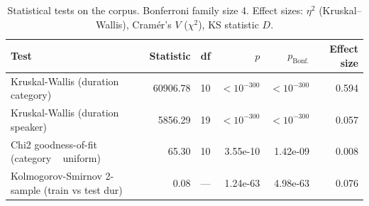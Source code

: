 \begin{table}[!t]
  \centering
  \caption{Statistical tests on the corpus. Bonferroni family size 4. Effect sizes: $\eta^2$ (Kruskal--Wallis), Cram\'er's $V$ ($\chi^2$), KS statistic $D$.}
  \label{tab:statistical_tests}
  \small
  \begin{tabular}{lrrrrr}
  \toprule
  Test & Statistic & df & $p$ & $p_{\mathrm{Bonf.}}$ & Effect size \\
  \midrule
  Kruskal-Wallis (duration ~ category) & 60906.78 & 10 & ${<}10^{-300}$ & ${<}10^{-300}$ & 0.594 \\
  Kruskal-Wallis (duration ~ speaker) & 5856.29 & 19 & ${<}10^{-300}$ & ${<}10^{-300}$ & 0.057 \\
  Chi2 goodness-of-fit (category ~ uniform) & 65.30 & 10 & 3.55e-10 & 1.42e-09 & 0.008 \\
  Kolmogorov-Smirnov 2-sample (train vs test dur) & 0.08 & --- & 1.24e-63 & 4.98e-63 & 0.076 \\
  \bottomrule
  \end{tabular}
\end{table}
